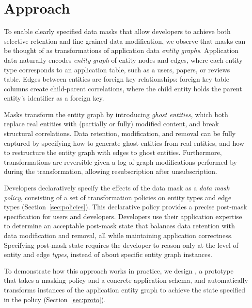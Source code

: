 \section{Approach}
To enable clearly specified data masks that allow developers to achieve both selective retention and
fine-grained data modification, we observe that masks can be thought of as transformations of
application data \emph{entity graphs}.  Application data naturally encodes \emph{entity graph} of
entity nodes and edges, where each entity type corresponds to an application table, such as a users,
papers, or reviews table. Edges between entities are foreign key relationships: foreign key table
columns create child-parent correlations, where the child entity holds the parent entity's
identifier as a foreign key. 

Masks transform the entity graph by introducing \emph{ghost entities}, which both replace real
entities with (partially or fully) modified content, and break structural correlations. Data
retention, modification, and removal can be fully captured by specifying how to generate ghost
entities from real entities, and how to restructure the entity graph with edges to ghost entities.
Furthermore, transformations are reversible given a log of graph modifications performed by during
the transformation, allowing \eg resubscription after unsubscription.

Developers declaratively specify the effects of the data mask as a \emph{data mask policy},
consisting of a set of transformation policies on entity types and edge types
(Section~\ref{sec:policies}). This declarative policy provides a precise post-mask specification for
users and developers. Developers use their application expertise to determine an acceptable
post-mask state that balances data retention with data modification and removal, all while
maintaining application correctness.  Specifying post-mask state requires the developer to reason
only at the level of entity and edge \emph{types}, instead of about specific entity graph instances.

To demonstrate how this approach works in practice, we design \sys, a prototype that takes a masking
policy and a concrete application schema, and automatically transforms instances of the application
entity graph to achieve the state specified in the policy (Section~\ref{sec:proto}).

